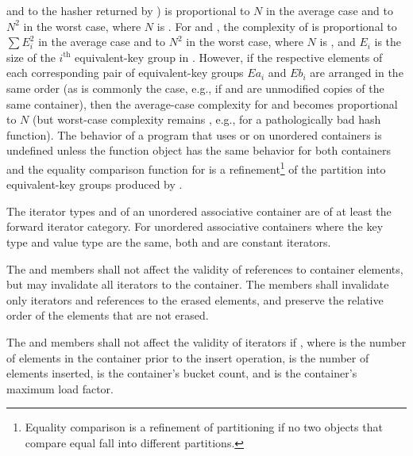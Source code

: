 and to the hasher returned by ) is proportional to
$N$ in the average case and to $N^2$ in the worst case, where $N$ is
. For  and ,
the complexity of  is proportional to $\sum E_i^2$
in the average case and to $N^2$ in the worst case, where $N$ is ,
and $E_i$ is the size of the $i^\text{th}$ equivalent-key group in .
However, if the respective elements of each corresponding pair of
equivalent-key groups $Ea_i$ and $Eb_i$ are arranged in the same order
(as is commonly the case, e.g., if  and  are unmodified copies
of the same container), then the average-case complexity for
 and  becomes
proportional to $N$ (but worst-case complexity remains , e.g., for
a pathologically bad hash function). The behavior of a program that uses
 or  on unordered containers is undefined
unless the  function object has
the same behavior for both containers and the equality comparison function
for  is a refinement\footnote{Equality comparison is a refinement
of partitioning if no two objects that
compare equal fall into different partitions.}
of the partition into equivalent-key groups produced by .

\pnum
{}%
The iterator types  and  of
an unordered associative container are of at least the forward iterator
category.  For unordered associative containers where the key type and
value type are the same, both  and
 are constant iterators.

\pnum
{}%
The  and  members shall not affect the validity of references to
container elements, but may invalidate all iterators to the
container.  The  members shall invalidate only iterators and
references to the erased elements, and preserve the relative order of the
elements that are not erased.

\pnum
{}%
%
The  and  members shall not affect the validity of iterators if
, where  is the number of elements in
the container prior to the insert operation,  is the
number of elements inserted,  is the container's bucket count, and
 is the container's maximum load factor.


